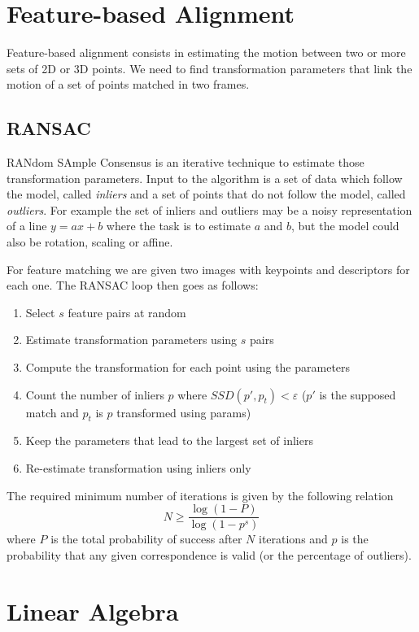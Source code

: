 \documentclass[a4paper,twocolumn]{article}
\begin{document}
\section{Feature-based Alignment}
Feature-based alignment consists in estimating the motion between two or more
sets of 2D or 3D points. We need to find transformation parameters that link
the motion of a set of points matched in two frames.

\subsection{RANSAC}
RANdom SAmple Consensus is an iterative technique to estimate those transformation
parameters. Input to the algorithm is a set of data which follow the model,
called \textit{inliers} and a set of points that do not follow the model, called
\textit{outliers}. For example the set of inliers and outliers may be a noisy
representation of a line $y=ax+b$ where the task is to estimate $a$ and
$b$, but the model could also be rotation, scaling or affine.

For feature matching we are given two images with keypoints and descriptors for
each one. The RANSAC loop then goes as follows:
\begin{enumerate}
	\item Select $s$ feature pairs at random
	\item Estimate transformation parameters using $s$ pairs
	\item Compute the transformation for each point using the parameters
	\item Count the number of inliers $p$ where $SSD(p',p_t)<\varepsilon$
		($p'$ is the supposed match and $p_t$ is $p$ transformed using params)
	\item Keep the parameters that lead to the largest set of inliers
	\item Re-estimate transformation using inliers only
\end{enumerate}
The required minimum number of iterations is given by the following relation
\begin{equation}
	N \ge \frac{\log(1-P)}{\log(1-p^s)}
\end{equation}
where $P$ is the total probability of success after $N$ iterations and
$p$ is the probability that any given correspondence is valid (or the percentage
of outliers).




\newpage

\appendix
\section{Linear Algebra}
\end{document}
